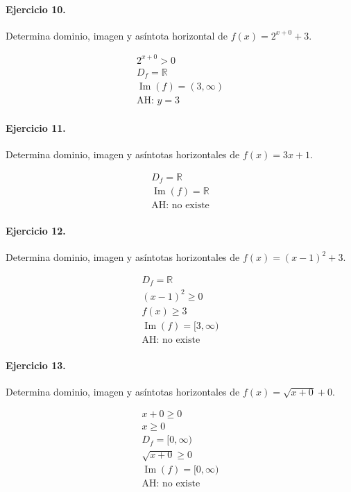 \documentclass[11pt,a4paper]{article}
\begin{document}
\paragraph{Ejercicio 10.} Determina dominio, imagen y asíntota horizontal de $f(x)=2^{x+0}+3$.

\[
\begin{aligned}
2^{x+0}>0\\
D_f=\mathbb{R}\\
\operatorname{Im}(f)=(3,\infty)\\
\text{AH: }y=3
\end{aligned}
\]


\paragraph{Ejercicio 11.} Determina dominio, imagen y asíntotas horizontales de $f(x)=3x+1$.

\[
\begin{aligned}
D_f=\mathbb{R}\\
\operatorname{Im}(f)=\mathbb{R}\\
\text{{AH: no existe}}
\end{aligned}
\]


\paragraph{Ejercicio 12.} Determina dominio, imagen y asíntotas horizontales de $f(x)=(x-1)^2+3$.

\[
\begin{aligned}
D_f=\mathbb{R}\\
(x-1)^2\ge 0\\
f(x)\ge 3\\
\operatorname{Im}(f)=[3,\infty)\\
\text{{AH: no existe}}
\end{aligned}
\]


\paragraph{Ejercicio 13.} Determina dominio, imagen y asíntotas horizontales de $f(x)=\sqrt{x+0}+0$.

\[
\begin{aligned}
x+0\ge0\\
x\ge 0\\
D_f=[0,\infty)\\
\sqrt{x+0}\ge0\\
\operatorname{Im}(f)=[0,\infty)\\
\text{{AH: no existe}}
\end{aligned}
\]
\end{document}
